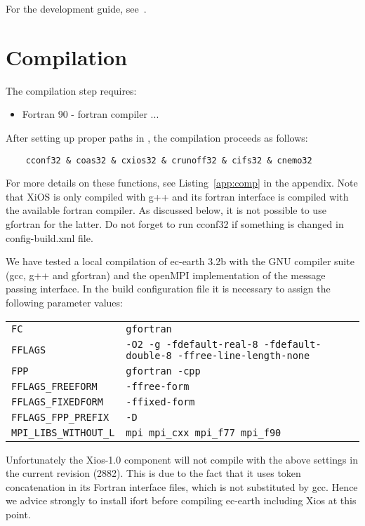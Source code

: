 For the development guide, see~\cite{dev-guide}.



\section{Compilation}

The compilation step requires:
\begin{itemize}
    \item Fortran 90 - fortran compiler
    ...
\end{itemize}



After setting up proper paths in , the compilation proceeds as follows:
\begin{verbatim}
    cconf32 & coas32 & cxios32 & crunoff32 & cifs32 & cnemo32  
\end{verbatim}
For more details on these functions, see Listing~\ref{app:comp} in the appendix. 
Note that XiOS is only compiled with g++ and its fortran interface is compiled with the available fortran compiler. As discussed below, it is not possible to use gfortran for the latter. Do not forget to run cconf32 if something is changed in config-build.xml file.

We have tested a local compilation of ec-earth 3.2b with the GNU compiler suite (gcc, g++ and gfortran) and the openMPI implementation of the message passing interface. In the build configuration file it is necessary to assign the following parameter values:
\begin{center}
\begin{tabular}{ll}
\texttt{FC}&\texttt{gfortran}\\
\texttt{FFLAGS}&\texttt{-O2 -g -fdefault-real-8 -fdefault-double-8 -ffree-line-length-none}\\
\texttt{FPP}&\texttt{gfortran -cpp}\\
\texttt{FFLAGS\_FREEFORM}&\texttt{-ffree-form}\\
\texttt{FFLAGS\_FIXEDFORM}&\texttt{-ffixed-form}\\
\texttt{FFLAGS\_FPP\_PREFIX}&\texttt{-D}\\
\texttt{MPI\_LIBS\_WITHOUT\_L}&\texttt{mpi mpi\_cxx mpi\_f77 mpi\_f90}\\
\end{tabular}
\end{center}
Unfortunately the Xios-1.0 component will not compile with the above settings in the current revision (2882). This is due to the fact that it uses token concatenation in its Fortran interface files, which is not substituted by gcc. Hence we advice strongly to install ifort before compiling ec-earth including Xios at this point. 

